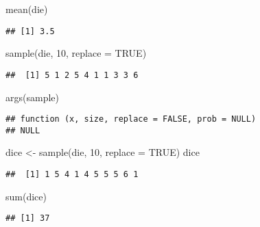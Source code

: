 \documentclass[
]{article}
\newenvironment{Shaded}{\begin{snugshade}}{\end{snugshade}}
\newcommand{\AttributeTok}[1]{\textcolor[rgb]{0.77,0.63,0.00}{#1}}
\newcommand{\ConstantTok}[1]{\textcolor[rgb]{0.00,0.00,0.00}{#1}}
\newcommand{\DecValTok}[1]{\textcolor[rgb]{0.00,0.00,0.81}{#1}}
\newcommand{\FunctionTok}[1]{\textcolor[rgb]{0.00,0.00,0.00}{#1}}
\newcommand{\NormalTok}[1]{#1}
\newcommand{\OtherTok}[1]{\textcolor[rgb]{0.56,0.35,0.01}{#1}}
\begin{document}
\begin{Shaded}
\begin{Highlighting}[]
\FunctionTok{mean}\NormalTok{(die)}
\end{Highlighting}
\end{Shaded}

\begin{verbatim}
## [1] 3.5
\end{verbatim}

\begin{Shaded}
\begin{Highlighting}[]
\FunctionTok{sample}\NormalTok{(die, }\DecValTok{10}\NormalTok{, }\AttributeTok{replace =} \ConstantTok{TRUE}\NormalTok{)}
\end{Highlighting}
\end{Shaded}

\begin{verbatim}
##  [1] 5 1 2 5 4 1 1 3 3 6
\end{verbatim}

\begin{Shaded}
\begin{Highlighting}[]
\FunctionTok{args}\NormalTok{(sample)}
\end{Highlighting}
\end{Shaded}

\begin{verbatim}
## function (x, size, replace = FALSE, prob = NULL) 
## NULL
\end{verbatim}

\begin{Shaded}
\begin{Highlighting}[]
\NormalTok{dice }\OtherTok{\textless{}{-}}  \FunctionTok{sample}\NormalTok{(die, }\DecValTok{10}\NormalTok{, }\AttributeTok{replace =} \ConstantTok{TRUE}\NormalTok{)}
\NormalTok{dice}
\end{Highlighting}
\end{Shaded}

\begin{verbatim}
##  [1] 1 5 4 1 4 5 5 5 6 1
\end{verbatim}

\begin{Shaded}
\begin{Highlighting}[]
\FunctionTok{sum}\NormalTok{(dice)}
\end{Highlighting}
\end{Shaded}

\begin{verbatim}
## [1] 37
\end{verbatim}
\end{document}
